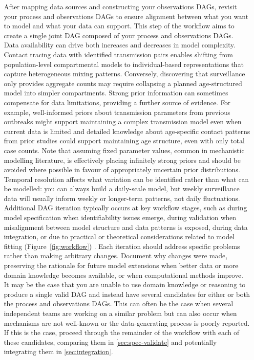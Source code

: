\documentclass{article}
\begin{document}
After mapping data sources and constructing your observations DAGs, revisit your process and observations DAGs to ensure alignment between what you want to model and what your data can support.
This step of the workflow aims to create a single joint DAG composed of your process and observations DAGs.
Data availability can drive both increases and decreases in model complexity.
Contact tracing data with identified transmission pairs enables shifting from population-level compartmental models to individual-based representations that capture heterogeneous mixing patterns.
Conversely, discovering that surveillance only provides aggregate counts may require collapsing a planned age-structured model into simpler compartments.
Strong prior information can sometimes compensate for data limitations, providing a further source of evidence.
For example, well-informed priors about transmission parameters from previous outbreaks might support maintaining a complex transmission model even when current data is limited and detailed knowledge about age-specific contact patterns from prior studies could support maintaining age structure, even with only total case counts.
Note that assuming fixed parameter values, common in mechanistic modelling literature, is effectively placing infinitely strong priors and should be avoided where possible in favour of appropriately uncertain prior distributions.
Temporal resolution affects what variation can be identified rather than what can be modelled: you can always build a daily-scale model, but weekly surveillance data will usually inform weekly or longer-term patterns, not daily fluctuations.
Additional DAG iteration typically occurs at key workflow stages, such as during model specification when identifiability issues emerge, during validation when misalignment between model structure and data patterns is exposed, during data integration, or due to practical or theoretical considerations related to model fitting (Figure~\ref{fig:workflow}) \citep{corbella2022inferring}.
Each iteration should address specific problems rather than making arbitrary changes.
Document why changes were made, preserving the rationale for future model extensions when better data or more domain knowledge becomes available, or when computational methods improve.
It may be the case that you are unable to use domain knowledge or reasoning to produce a single valid DAG and instead have several candidates for either or both the process and observations DAGs. 
This can often be the case when several independent teams are working on a similar problem but can also occur when mechanisms are not well-known or the data-generating process is poorly reported.
If this is the case, proceed through the remainder of the workflow with each of these candidates, comparing them in \ref{sec:spec-validate} and potentially integrating them in \ref{sec:integration}.
\end{document}
